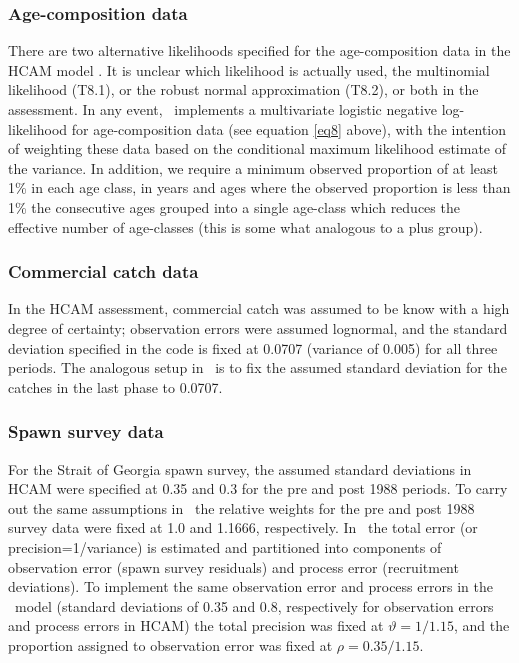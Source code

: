 	
\subsubsection{Age-composition data}
There are two alternative likelihoods specified for the age-composition data in the HCAM model \citep[see Table 8 in Appendix B in][]{Clear2010}.  It is unclear which likelihood is actually used, the multinomial likelihood (T8.1), or the robust normal approximation (T8.2), or both in the  assessment.  In any event, \iscam\ implements a multivariate logistic negative log-likelihood for age-composition data (see equation \ref{eq8} above), with the intention of weighting these data based on the conditional maximum likelihood estimate of the variance.  In addition, we require a minimum observed proportion of at least 1\% in each age class, in years and ages where the observed proportion is less than 1\% the consecutive ages grouped into a single age-class which reduces the effective number of age-classes (this is some what analogous to a plus group).

\subsubsection{Commercial catch data}
	In the HCAM assessment, commercial catch was assumed to be know with a high degree of certainty; observation errors were assumed lognormal, and the standard deviation specified in the code is fixed at 0.0707 (variance of 0.005) for all three periods.  The analogous setup in \iscam\ is to fix the assumed standard deviation for the catches in the last phase to 0.0707.
	
\subsubsection{Spawn survey data}
 	For the Strait of Georgia spawn survey, the assumed standard deviations in HCAM were specified at 0.35 and 0.3 for the pre and post 1988 periods.  To carry out the same assumptions in \iscam\ the relative weights for the pre and post 1988 survey data were fixed at 1.0 and 1.1666, respectively.  In \iscam\ the total error (or precision=1/variance) is estimated and partitioned into components of observation error (spawn survey residuals) and process error (recruitment deviations).  To implement the same observation error and process errors in the \iscam\ model (standard deviations of 0.35 and 0.8, respectively for observation errors and process errors in HCAM) the total precision was fixed at $\vartheta=1/1.15$, and the proportion assigned to observation error was fixed at $\rho = 0.35/1.15$.

